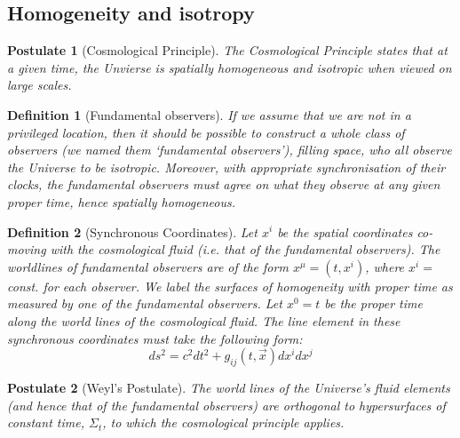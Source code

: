 \documentclass[a4paper]{article}
\newtheorem{post}{Postulate}[section]
\theoremstyle{new}
\newtheorem{defi}{Definition}[section]
\begin{document}
\subsection{Homogeneity and isotropy}
\begin{post}[Cosmological Principle]
The Cosmological Principle states that at a given time, the Unvierse is spatially homogeneous and isotropic when viewed on large scales. 
\end{post}
\begin{defi}[Fundamental observers]
If we assume that we are not in a privileged location, then it should be possible to construct a whole class of observers (we named them `fundamental observers'), filling space, who all observe the Universe to be isotropic. Moreover, with appropriate synchronisation of their clocks, the fundamental observers must agree on what they observe at any given proper time, hence spatially homogeneous.
\end{defi}
\begin{defi}[Synchronous Coordinates]
Let $x^i$ be the spatial coordinates co-moving with the cosmological fluid (i.e. that of the fundamental observers). The worldlines of fundamental observers are of the form $x^\mu=(t,x^i)$, where $x^i=$const. for each observer. We label the surfaces of homogeneity with proper time as measured by one of the fundamental observers. Let $x^0=t$ be the proper time along the world lines of the cosmological fluid. The line element in these synchronous coordinates must take the following form:
\begin{equation}
    ds^2=c^2dt^2+g_{ij}(t,\vec{x})dx^idx^j\label{synchronous}
\end{equation}
\end{defi}
\begin{post}[Weyl's Postulate]
The world lines of the Universe's fluid elements (and hence that of the fundamental observers) are orthogonal to hypersurfaces of constant time, $\Sigma_t$, to which the cosmological principle applies.
\end{post}
\end{document}
